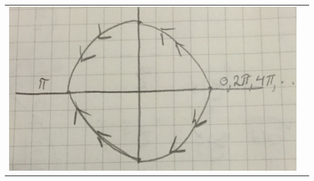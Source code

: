 \documentclass[12pt]{article}
\newenvironment{exercise}[2][Exercise]{\begin{trivlist}
\item[\hskip \labelsep {\bfseries #1}\hskip \labelsep {\bfseries #2.}]}{\end{trivlist}}
\begin{document}
\begin{exercise}{2}
\begin{enumerate}
\begin{tabular}{ll}
	\includegraphics[scale=.07]{phaseportrait2b}
	\end{tabular}
\end{enumerate}	
\end{exercise}
\end{document}
